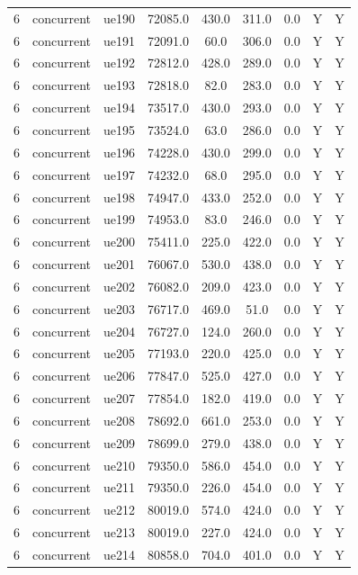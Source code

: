 \begin{table}[ht]
\begin{tabular}{|c|c|c|c|c|c|c|c|c|}
6 & concurrent & ue190 & 72085.0 & 430.0 & 311.0 & 0.0 & Y & Y \\
6 & concurrent & ue191 & 72091.0 & 60.0 & 306.0 & 0.0 & Y & Y \\
6 & concurrent & ue192 & 72812.0 & 428.0 & 289.0 & 0.0 & Y & Y \\
6 & concurrent & ue193 & 72818.0 & 82.0 & 283.0 & 0.0 & Y & Y \\
6 & concurrent & ue194 & 73517.0 & 430.0 & 293.0 & 0.0 & Y & Y \\
6 & concurrent & ue195 & 73524.0 & 63.0 & 286.0 & 0.0 & Y & Y \\
6 & concurrent & ue196 & 74228.0 & 430.0 & 299.0 & 0.0 & Y & Y \\
6 & concurrent & ue197 & 74232.0 & 68.0 & 295.0 & 0.0 & Y & Y \\
6 & concurrent & ue198 & 74947.0 & 433.0 & 252.0 & 0.0 & Y & Y \\
6 & concurrent & ue199 & 74953.0 & 83.0 & 246.0 & 0.0 & Y & Y \\
6 & concurrent & ue200 & 75411.0 & 225.0 & 422.0 & 0.0 & Y & Y \\
6 & concurrent & ue201 & 76067.0 & 530.0 & 438.0 & 0.0 & Y & Y \\
6 & concurrent & ue202 & 76082.0 & 209.0 & 423.0 & 0.0 & Y & Y \\
6 & concurrent & ue203 & 76717.0 & 469.0 & 51.0 & 0.0 & Y & Y \\
6 & concurrent & ue204 & 76727.0 & 124.0 & 260.0 & 0.0 & Y & Y \\
6 & concurrent & ue205 & 77193.0 & 220.0 & 425.0 & 0.0 & Y & Y \\
6 & concurrent & ue206 & 77847.0 & 525.0 & 427.0 & 0.0 & Y & Y \\
6 & concurrent & ue207 & 77854.0 & 182.0 & 419.0 & 0.0 & Y & Y \\
6 & concurrent & ue208 & 78692.0 & 661.0 & 253.0 & 0.0 & Y & Y \\
6 & concurrent & ue209 & 78699.0 & 279.0 & 438.0 & 0.0 & Y & Y \\
6 & concurrent & ue210 & 79350.0 & 586.0 & 454.0 & 0.0 & Y & Y \\
6 & concurrent & ue211 & 79350.0 & 226.0 & 454.0 & 0.0 & Y & Y \\
6 & concurrent & ue212 & 80019.0 & 574.0 & 424.0 & 0.0 & Y & Y \\
6 & concurrent & ue213 & 80019.0 & 227.0 & 424.0 & 0.0 & Y & Y \\
6 & concurrent & ue214 & 80858.0 & 704.0 & 401.0 & 0.0 & Y & Y \\

\end{tabular}
\end{table}
